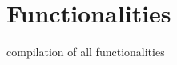 \section{Functionalities}
compilation of all functionalities

                                







